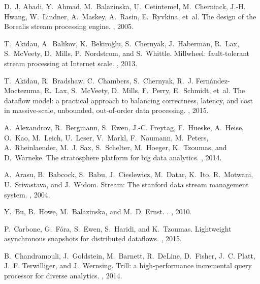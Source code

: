 \documentclass[11pt]{article}
\begin{document}
\vspace{-3mm}
\begin{thebibliography}{10}
\itemsep=1pt
\begin{small}


D.~J. Abadi, Y.~Ahmad, M.~Balazinska, U.~Cetintemel, M.~Cherniack, J.-H. Hwang,
  W.~Lindner, A.~Maskey, A.~Rasin, E.~Ryvkina, et~al.
\newblock The design of the Borealis stream processing engine.
, 2005.

T.~Akidau, A.~Balikov, K.~Bekiro{\u{g}}lu, S.~Chernyak, J.~Haberman, R.~Lax,
  S.~McVeety, D.~Mills, P.~Nordstrom, and S.~Whittle.
\newblock Millwheel: fault-tolerant stream processing at Internet scale.
, 2013.

T.~Akidau, R.~Bradshaw, C.~Chambers, S.~Chernyak, R.~J.
  Fern{\'a}ndez-Moctezuma, R.~Lax, S.~McVeety, D.~Mills, F.~Perry, E.~Schmidt,
  et~al.
\newblock The dataflow model: a practical approach to balancing correctness,
  latency, and cost in massive-scale, unbounded, out-of-order data processing.
, 2015.

A.~Alexandrov, R.~Bergmann, S.~Ewen, J.-C. Freytag, F.~Hueske, A.~Heise,
  O.~Kao, M.~Leich, U.~Leser, V.~Markl, F.~Naumann, M.~Peters, A.~Rheinlaender,
  M.~J. Sax, S.~Schelter, M.~Hoeger, K.~Tzoumas, and D.~Warneke.
\newblock The stratosphere platform for big data analytics.
, 2014.

A.~Arasu, B.~Babcock, S.~Babu, J.~Cieslewicz, M.~Datar, K.~Ito, R.~Motwani,
  U.~Srivastava, and J.~Widom.
\newblock Stream: The stanford data stream management system.
, 2004.

Y.~Bu, B.~Howe, M.~Balazinska, and M.~D. Ernst.
.
, 2010.

P.~Carbone, G.~F{\'o}ra, S.~Ewen, S.~Haridi, and K.~Tzoumas.
\newblock Lightweight asynchronous snapshots for distributed dataflows.
, 2015.

B.~Chandramouli, J.~Goldstein, M.~Barnett, R.~DeLine, D.~Fisher, J.~C. Platt,
  J.~F. Terwilliger, and J.~Wernsing.
\newblock Trill: a high-performance incremental query processor for diverse
  analytics.
, 2014.


\end{small}
\end{thebibliography}
\end{document}
